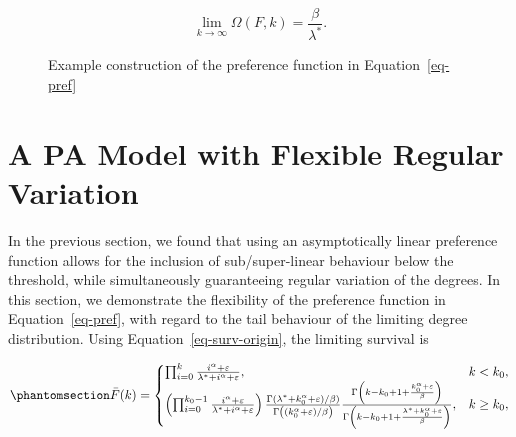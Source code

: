 \documentclass[
  sn-basic,
]{sn-jnl}
\theoremstyle{plain}
\theoremstyle{plain}
\theoremstyle{remark}
\begin{document}
\[
\lim_{k\rightarrow\infty}\Omega(F,k) = \frac{\beta}{\lambda^*}.
\]

\begin{figure}


\caption{\label{fig-ex}Example construction of the preference function
in Equation~\ref{eq-pref}}

\end{figure}%

\newpage

\section{A PA Model with Flexible Regular Variation}\label{sec-model}

In the previous section, we found that using an asymptotically linear
preference function allows for the inclusion of sub/super-linear
behaviour below the threshold, while simultaneously guaranteeing regular
variation of the degrees. In this section, we demonstrate the
flexibility of the preference function in Equation~\ref{eq-pref}, with
regard to the tail behaviour of the limiting degree distribution. Using
Equation~\ref{eq-surv-origin}, the limiting survival is

\begin{equation}\phantomsection\label{eq-polysurv}{
\bar F(k) = \begin{cases}
\prod_{i=0}^{k}\frac{i^\alpha + \varepsilon}{\lambda^*+i^\alpha + \varepsilon},&k<k_0,\\
\left(\prod_{i=0}^{k_0-1}\frac{i^\alpha + \varepsilon}{\lambda^*+i^\alpha + \varepsilon}\right)\frac{\Gamma(\lambda^*+k_0^\alpha + \varepsilon)/\beta)}{\Gamma\left((k_0^\alpha + \varepsilon)/\beta\right)} \frac{\Gamma\left(k-k_0 + 1 +\frac{k_0^\alpha + \varepsilon}{\beta}\right)}{\Gamma\left(k-k_0 + 1 +\frac{\lambda^* +k_0^\alpha + \varepsilon}{\beta}\right)},&k\ge k_0,
\end{cases}
}\end{equation}
\end{document}
